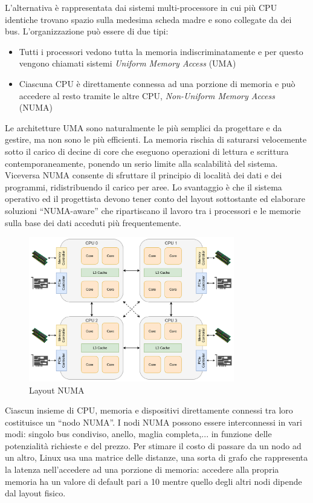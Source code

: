 L'alternativa è rappresentata dai sistemi multi-processore in cui più CPU identiche trovano spazio sulla medesima scheda madre e sono collegate da dei bus. L'organizzazione può essere di due tipi:

\begin{itemize}
    \item Tutti i processori vedono tutta la memoria indiscriminatamente e per questo vengono chiamati sistemi \textit{Uniform Memory Access} (UMA)
    \item Ciascuna CPU è direttamente connessa ad una porzione di memoria e può accedere al resto tramite le altre CPU, \textit{Non-Uniform Memory Access} (NUMA)
\end{itemize}

Le architetture UMA sono naturalmente le più semplici da progettare e da gestire, ma non sono le più efficienti. La memoria rischia di saturarsi velocemente sotto il carico di decine di core che eseguono operazioni di lettura e scrittura contemporaneamente, ponendo un serio limite alla scalabilità del sistema. Viceversa NUMA consente di sfruttare il principio di località dei dati e dei programmi, ridistribuendo il carico per aree. Lo svantaggio è che il sistema operativo ed il progettista devono tener conto del layout sottostante ed elaborare soluzioni ``NUMA-aware'' che ripartiscano il lavoro tra i processori e le memorie sulla base dei dati acceduti più frequentemente.

\begin{figure}[htb]
    \includegraphics[width=0.8\textwidth]{graphics/numa.png}
    \caption{Layout NUMA}
    \label{fig:numa}
\end{figure}

Ciascun insieme di CPU, memoria e dispositivi direttamente connessi tra loro costituisce un ``nodo NUMA''. I nodi NUMA possono essere interconnessi in vari modi: singolo bus condiviso, anello, maglia completa,... in funzione delle potenzialità richieste e del prezzo. Per stimare il costo di passare da un nodo ad un altro, Linux usa una matrice delle distanze, una sorta di grafo che rappresenta la latenza nell'accedere ad una porzione di memoria: accedere alla propria memoria ha un valore di default pari a 10 mentre quello degli altri nodi dipende dal layout fisico.

